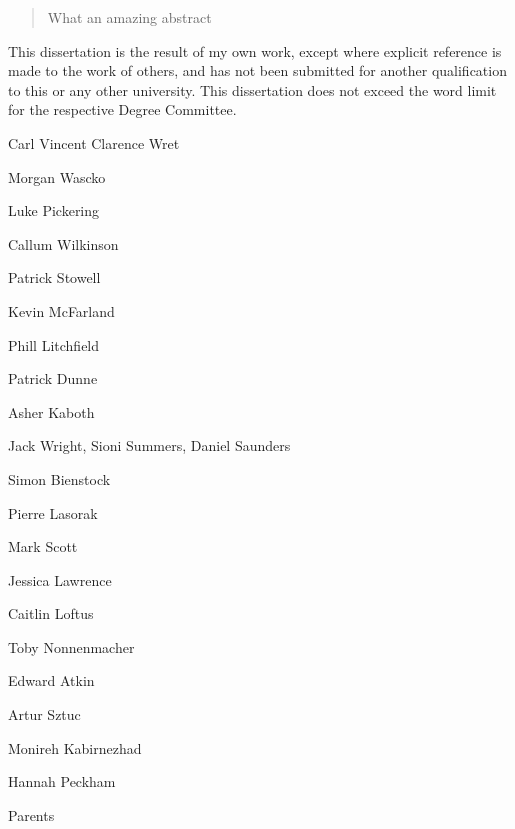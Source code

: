 
\begin{abstract}%
  What an amazing abstract
\end{abstract}

\begin{declaration}
  This dissertation is the result of my own work, except where explicit reference is made to the work of others, and has not been submitted for another qualification to this or any other university. This dissertation does not exceed the word limit for the respective Degree Committee.
  \vspace*{1cm}
  \begin{flushright}
    Carl Vincent Clarence Wret
  \end{flushright}
\end{declaration}

\begin{acknowledgements}
  Morgan Wascko
  
  Luke Pickering
  
  Callum Wilkinson
  
  Patrick Stowell
  
  Kevin McFarland
  
  Phill Litchfield
  
  Patrick Dunne
  
  Asher Kaboth
  
  Jack Wright, Sioni Summers, Daniel Saunders
  
  Simon Bienstock
  
  Pierre Lasorak
  
  Mark Scott
  
  Jessica Lawrence
  
  Caitlin Loftus
  
  Toby Nonnenmacher
  
  Edward Atkin
  
  Artur Sztuc
  
  Monireh Kabirnezhad
  
  Hannah Peckham
  
  Parents
\end{acknowledgements}

